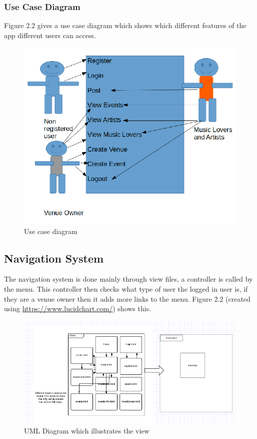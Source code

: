 \subsubsection{Use Case Diagram}
Figure 2.2 gives a use case diagram which shows which different features of the app different users can access.

\begin{figure}[H]
\includegraphics[width=\textwidth,height=\textheight,keepaspectratio]{images/usecase}
\caption{Use case diagram}
\end{figure}



\subsection{Navigation System}
The navigation system is done mainly through view files, a controller is called by the menu. This controller then checks what type of user the logged in user is, if they are a venue owner then it adds more links to the menu. Figure 2.2 (created using \url{https://www.lucidchart.com/}) shows this.

\begin{figure}[H]
\includegraphics[width=\textwidth,height=\textheight,keepaspectratio]{images/systemdesign}
\caption{UML Diagram which illustrates the view}
\end{figure}

